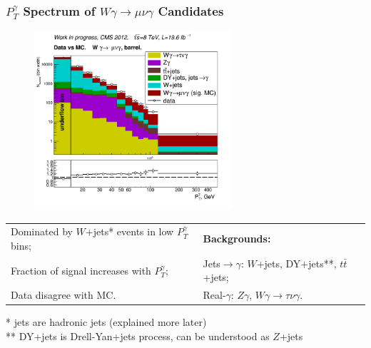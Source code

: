 \begin{frame}\frametitle{$P_T^{\gamma}$ Spectrum of $W\gamma\rightarrow\mu\nu\gamma$ Candidates}
  \begin{figure}[htb]
    \begin{center}
       \includegraphics[width=0.65\textwidth]{../figs/ForPresentation/forDefense_DATAvsMC_Wg_Muon.png}  
    \end{center}
  \end{figure}

\tiny
  \begin{table}[h]
     \tiny
     \begin{center}
     \begin{tabular}{|l|l|}
     \hline
     Dominated by $W$+jets* events in low $P_T^{\gamma}$ bins; &  {\bfseries{ Backgrounds:}}\\ 
     Fraction of signal increases with $P_T^{\gamma}$; & Jets$\rightarrow\gamma$: $W$+jets, DY+jets**, $t\bar{t}$+jets;\\
     Data disagree with MC. & Real-$\gamma$: $Z\gamma$, $W\gamma\rightarrow\tau\nu\gamma$.\\
     \hline
      \end{tabular}
      \end{center}
  \end{table}

* jets are hadronic jets (explained more later)\\
** DY+jets is Drell-Yan+jets process, can be understood as $Z$+jets

\end{frame}


